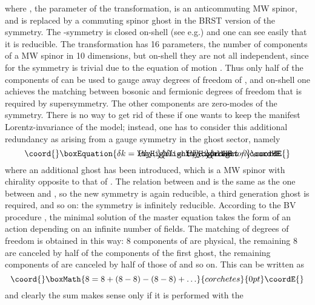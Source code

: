 \documentclass[a4paper,12pt]{article}
\begin{document}
where \myHighlight{$\kappa$}\coordHE{}, the parameter of the transformation, is an
anticommuting MW spinor, and is replaced by a commuting spinor ghost
\coordHE{} in the BRST version of the symmetry.  The \myHighlight{$\kappa$}\coordHE{}-symmetry is
closed on-shell (see e.g.\cite{green3}) and one can see easily that it
is reducible. The transformation has 16 parameters, the number of
components of a MW spinor in 10 dimensions, but on-shell they are not
all independent, since for \coordHE{} the symmetry is
trivial due to the equation of motion \coordHE{}. Thus only half of the
components of \myHighlight{$\kappa$}\coordHE{} can be used to gauge away degrees of freedom of
\myHighlight{$\theta$}\coordHE{}, and on-shell one achieves the matching between bosonic and
fermionic degrees of freedom that is required by supersymmetry. The
other components are zero-modes of the symmetry.  There is no way to
get rid of these if one wants to keep the manifest Lorentz-invariance
of the model; instead, one has to consider this additional redundancy
as arising from a gauge symmetry in the ghost sector, namely
\begin{equation}\coord{}\boxEquation{
  \delta k = \SL{P} k_2 \, ,
}{
  \delta k = \SL{P} k_2 \, ,
}{ecuacion}\coordE{}\end{equation}
where an additional ghost has been introduced, which is a
MW spinor with chirality opposite to that of \coordHE{}.
The relation between \coordHE{} and \coordHE{} is the same as the one between
\myHighlight{$\theta$}\coordHE{} and \coordHE{}, so the new symmetry is again reducible, a third 
generation ghost is required, and so on: the symmetry is infinitely
reducible. 
According to the BV procedure \cite{BV}, the minimal solution of 
the master equation takes the form of an action depending on an
infinite number of fields. The matching of degrees of freedom is
obtained in this way: 8 components of \myHighlight{$\theta$}\coordHE{} are physical, the
remaining 8 are canceled by half of the components of the first ghost, 
the remaining components of \coordHE{} are canceled by half of those of \coordHE{} 
and so on. This can be written as
\begin{displaymath}\coord{}\boxMath{
  8 = 8 + (8-8) - (8 - 8) + \ldots
}{corchetes}{0pt}\coordE{}\end{displaymath}
and clearly the sum makes sense only if it is performed with the
\end{document}
